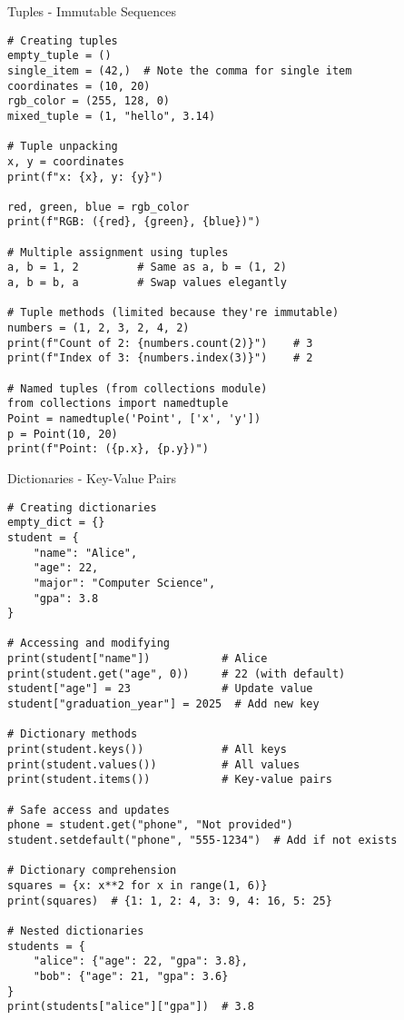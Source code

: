 \begin{frame}[fragile]{Tuples - Immutable Sequences}
    \begin{codeblock}
        \begin{lstlisting}
# Creating tuples
empty_tuple = ()
single_item = (42,)  # Note the comma for single item
coordinates = (10, 20)
rgb_color = (255, 128, 0)
mixed_tuple = (1, "hello", 3.14)

# Tuple unpacking
x, y = coordinates
print(f"x: {x}, y: {y}")

red, green, blue = rgb_color
print(f"RGB: ({red}, {green}, {blue})")

# Multiple assignment using tuples
a, b = 1, 2         # Same as a, b = (1, 2)
a, b = b, a         # Swap values elegantly

# Tuple methods (limited because they're immutable)
numbers = (1, 2, 3, 2, 4, 2)
print(f"Count of 2: {numbers.count(2)}")    # 3
print(f"Index of 3: {numbers.index(3)}")    # 2

# Named tuples (from collections module)
from collections import namedtuple
Point = namedtuple('Point', ['x', 'y'])
p = Point(10, 20)
print(f"Point: ({p.x}, {p.y})")
        \end{lstlisting}
    \end{codeblock}
\end{frame}

\begin{frame}[fragile]{Dictionaries - Key-Value Pairs}
    \begin{codeblock}
        \begin{lstlisting}
# Creating dictionaries
empty_dict = {}
student = {
    "name": "Alice",
    "age": 22,
    "major": "Computer Science",
    "gpa": 3.8
}

# Accessing and modifying
print(student["name"])           # Alice
print(student.get("age", 0))     # 22 (with default)
student["age"] = 23              # Update value
student["graduation_year"] = 2025  # Add new key

# Dictionary methods
print(student.keys())            # All keys
print(student.values())          # All values
print(student.items())           # Key-value pairs

# Safe access and updates
phone = student.get("phone", "Not provided")
student.setdefault("phone", "555-1234")  # Add if not exists

# Dictionary comprehension
squares = {x: x**2 for x in range(1, 6)}
print(squares)  # {1: 1, 2: 4, 3: 9, 4: 16, 5: 25}

# Nested dictionaries
students = {
    "alice": {"age": 22, "gpa": 3.8},
    "bob": {"age": 21, "gpa": 3.6}
}
print(students["alice"]["gpa"])  # 3.8
        \end{lstlisting}
    \end{codeblock}
\end{frame}

